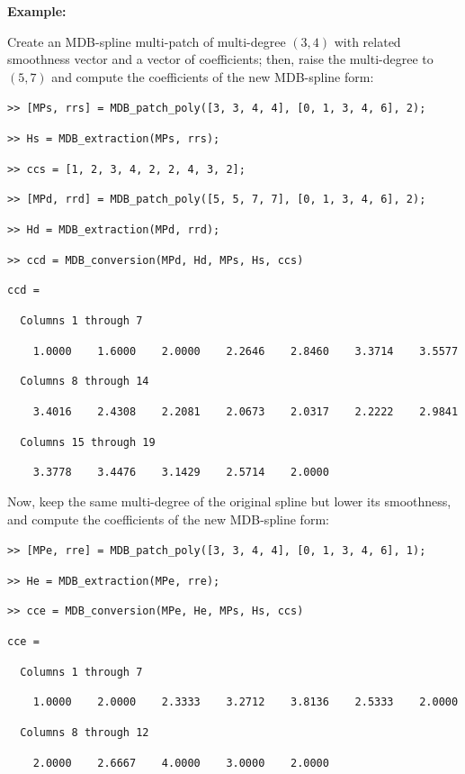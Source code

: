 \documentclass[10pt]{./acmtrans2e}
\newenvironment{example}
{\vspace*{0.1cm}
\noindent \textbf{Example:} \vspace*{0.15cm}

\setlength{\parskip}{0.5ex plus 0.5exminus 0.2 ex}
}
{\medskip
}
\begin{document}
\begin{example}
\noindent Create an MDB-spline multi-patch of multi-degree $(3,4)$ with related smoothness vector and a vector of coefficients; then, raise the multi-degree to $(5,7)$ and compute the coefficients of the new MDB-spline form:
\medskip

\texttt{>> [MPs, rrs] = MDB\_patch\_poly([3, 3, 4, 4], [0, 1, 3, 4, 6], 2);}

\texttt{>> Hs = MDB\_extraction(MPs, rrs);}

\texttt{>> ccs = [1, 2, 3, 4, 2, 2, 4, 3, 2];}

\texttt{>> [MPd, rrd] = MDB\_patch\_poly([5, 5, 7, 7], [0, 1, 3, 4, 6], 2);}

\texttt{>> Hd = MDB\_extraction(MPd, rrd);}

\texttt{>> ccd = MDB\_conversion(MPd, Hd, MPs, Hs, ccs)}

\texttt{ccd =}

\texttt{\ \ Columns 1 through 7}

\texttt{\ \ \ \ 1.0000\ \ \ \ 1.6000\ \ \ \ 2.0000\ \ \ \ 2.2646\ \ \ \ 2.8460\ \ \ \ 3.3714\ \ \ \ 3.5577}

\texttt{\ \ Columns 8 through 14}

\texttt{\ \ \ \ 3.4016\ \ \ \ 2.4308\ \ \ \ 2.2081\ \ \ \ 2.0673\ \ \ \ 2.0317\ \ \ \ 2.2222\ \ \ \ 2.9841}

\texttt{\ \ Columns 15 through 19}

\texttt{\ \ \ \ 3.3778\ \ \ \ 3.4476\ \ \ \ 3.1429\ \ \ \ 2.5714\ \ \ \ 2.0000}

\pagebreak
\noindent Now, keep the same multi-degree of the original spline but lower its smoothness, and compute the coefficients of the new MDB-spline form:
\medskip

\texttt{>> [MPe, rre] = MDB\_patch\_poly([3, 3, 4, 4], [0, 1, 3, 4, 6], 1);}

\texttt{>> He = MDB\_extraction(MPe, rre);}

\texttt{>> cce = MDB\_conversion(MPe, He, MPs, Hs, ccs)}

\texttt{cce =}

\texttt{\ \ Columns 1 through 7}

\texttt{\ \ \ \ 1.0000\ \ \ \ 2.0000\ \ \ \ 2.3333\ \ \ \ 3.2712\ \ \ \ 3.8136\ \ \ \ 2.5333\ \ \ \ 2.0000}

\texttt{\ \ Columns 8 through 12}

\texttt{\ \ \ \ 2.0000\ \ \ \ 2.6667\ \ \ \ 4.0000\ \ \ \ 3.0000\ \ \ \ 2.0000}


\end{example}
\end{document}
